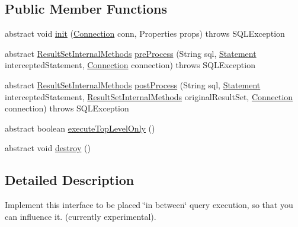 \subsection*{Public Member Functions}
\begin{DoxyCompactItemize}
\item 
abstract void \mbox{\hyperlink{interfacecom_1_1mysql_1_1jdbc_1_1_statement_interceptor_a985c3d5d0c9b9694cfb73ba92273409e}{init}} (\mbox{\hyperlink{interfacecom_1_1mysql_1_1jdbc_1_1_connection}{Connection}} conn, Properties props)  throws S\+Q\+L\+Exception
\item 
abstract \mbox{\hyperlink{interfacecom_1_1mysql_1_1jdbc_1_1_result_set_internal_methods}{Result\+Set\+Internal\+Methods}} \mbox{\hyperlink{interfacecom_1_1mysql_1_1jdbc_1_1_statement_interceptor_ae8b6b08014d450768f3f7088f43ce593}{pre\+Process}} (String sql, \mbox{\hyperlink{interfacecom_1_1mysql_1_1jdbc_1_1_statement}{Statement}} intercepted\+Statement, \mbox{\hyperlink{interfacecom_1_1mysql_1_1jdbc_1_1_connection}{Connection}} connection)  throws S\+Q\+L\+Exception
\item 
abstract \mbox{\hyperlink{interfacecom_1_1mysql_1_1jdbc_1_1_result_set_internal_methods}{Result\+Set\+Internal\+Methods}} \mbox{\hyperlink{interfacecom_1_1mysql_1_1jdbc_1_1_statement_interceptor_a09f86aac8aebe5751a6f920e42d2d9b4}{post\+Process}} (String sql, \mbox{\hyperlink{interfacecom_1_1mysql_1_1jdbc_1_1_statement}{Statement}} intercepted\+Statement, \mbox{\hyperlink{interfacecom_1_1mysql_1_1jdbc_1_1_result_set_internal_methods}{Result\+Set\+Internal\+Methods}} original\+Result\+Set, \mbox{\hyperlink{interfacecom_1_1mysql_1_1jdbc_1_1_connection}{Connection}} connection)  throws S\+Q\+L\+Exception
\item 
abstract boolean \mbox{\hyperlink{interfacecom_1_1mysql_1_1jdbc_1_1_statement_interceptor_a445950e1035a2519be9d5fbaf1fe1b8c}{execute\+Top\+Level\+Only}} ()
\item 
abstract void \mbox{\hyperlink{interfacecom_1_1mysql_1_1jdbc_1_1_statement_interceptor_a5da9bea29735c87ac10a67c34dcee9ef}{destroy}} ()
\end{DoxyCompactItemize}


\subsection{Detailed Description}
Implement this interface to be placed \char`\"{}in between\char`\"{} query execution, so that you can influence it. (currently experimental).

